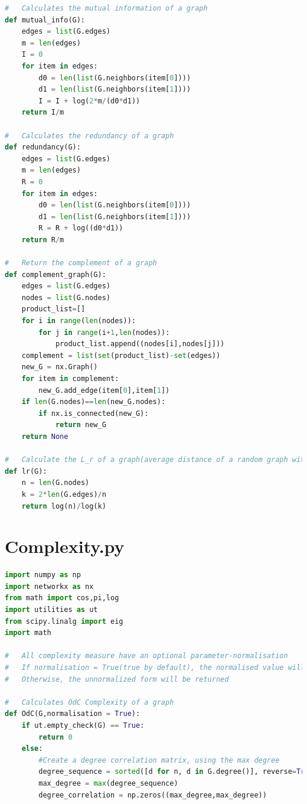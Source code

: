 \documentclass[12pt]{article}
\begin{document}
{\begin{lstlisting}[language=Python,breaklines=true]
#   Calculates the mutual information of a graph
def mutual_info(G):
    edges = list(G.edges)
    m = len(edges)
    I = 0
    for item in edges:
        d0 = len(list(G.neighbors(item[0])))
        d1 = len(list(G.neighbors(item[1]))) 
        I = I + log(2*m/(d0*d1))
    return I/m

#   Calculates the redundancy of a graph
def redundancy(G):
    edges = list(G.edges)
    m = len(edges)
    R = 0
    for item in edges:
        d0 = len(list(G.neighbors(item[0])))
        d1 = len(list(G.neighbors(item[1]))) 
        R = R + log((d0*d1))
    return R/m

#   Return the complement of a graph
def complement_graph(G):
    edges = list(G.edges)
    nodes = list(G.nodes)
    product_list=[]
    for i in range(len(nodes)):
        for j in range(i+1,len(nodes)):
            product_list.append((nodes[i],nodes[j]))
    complement = list(set(product_list)-set(edges))
    new_G = nx.Graph()
    for item in complement:
        new_G.add_edge(item[0],item[1])
    if len(G.nodes)==len(new_G.nodes):
        if nx.is_connected(new_G):
            return new_G
    return None

#   Calculate the L_r of a graph(average distance of a random graph with given m and n)
def lr(G):
    n = len(G.nodes)
    k = 2*len(G.edges)/n
    return log(n)/log(k)
\end{lstlisting}

\section{Complexity.py}
\label{complexity_code}
\begin{lstlisting}[language=Python,breaklines=true]
import numpy as np
import networkx as nx
from math import cos,pi,log
import utilities as ut
from scipy.linalg import eig
import math

#   All complexity measure have an optional parameter-normalisation
#   If normalisation = True(true by default), the normalised value will be returned
#   Otherwise, the unnormalized form will be returned

#   Calculates OdC Complexity of a graph
def OdC(G,normalisation = True):
    if ut.empty_check(G) == True:
        return 0
    else:
        #Create a degree correlation matrix, using the max degree 
        degree_sequence = sorted([d for n, d in G.degree()], reverse=True)
        max_degree = max(degree_sequence)
        degree_correlation = np.zeros((max_degree,max_degree))
        

\end{lstlisting}}
\end{document}
